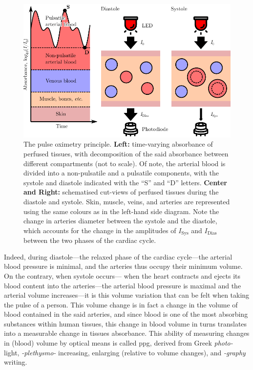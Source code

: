 \begin{figure}
	\centering
	\includegraphics{1_main_matter/co2hb_figures/ppg_principle.pdf}
	\caption[Pulse oximetry principle.]{The pulse oximetry principle. \textbf{Left:} time-varying absorbance of perfused tissues, with decomposition of the said absorbance between different compartments (not to scale). Of note, the arterial blood is divided into a non-pulsatile and a pulsatile components, with the systole and diastole indicated with the \enquote{S} and \enquote{D} letters. \textbf{Center and Right:} schematised cut-views of perfused tissues during the diastole and systole. Skin, muscle, veins, and arteries are represented using the same colours as in the left-hand side diagram. Note the change in arteries diameter between the systole and the diastole, which accounts for the change in the amplitudes of $I_\text{Sys}$ and $I_\text{Dias}$ between the two phases of the cardiac cycle.}
	\label{fig:co2hb:ppg_principle}
\end{figure}


Indeed, during diastole---the relaxed phase of the cardiac cycle---the arterial blood pressure is minimal, and the arteries thus occupy their minimum volume. On the contrary, when systole occurs---\ie{} when the heart contracts and ejects its blood content into the arteries---the arterial blood pressure is maximal and the arterial volume increases---it is this volume variation that can be felt when taking the pulse of a person. This volume change is in fact a change in the volume of blood contained in the said arteries, and since blood is one of the most absorbing substances within human tissues\cite{jacques2013}, this change in blood volume in turns translates into a measurable change in tissues absorbance. This ability of measuring changes in (blood) volume by optical means is called \gls{ppg}, derived from Greek \emph{photo-} light, \emph{-plethysmo-} increasing, enlarging (relative to volume changes), and \emph{-graphy} writing.

